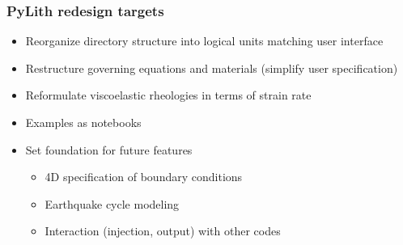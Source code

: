\documentclass[aspectratio=169]{beamer}
\begin{document}
\begin{frame}
  \frametitle{PyLith redesign targets}

  \begin{itemize}
  \item Reorganize directory structure into logical units matching user interface
  \item Restructure governing equations and materials (simplify user specification)
  \item Reformulate viscoelastic rheologies in terms of strain rate
  \item Examples as notebooks
  \item Set foundation for future features
    \begin{itemize}
    \item 4D specification of boundary conditions
    \item Earthquake cycle modeling
    \item Interaction (injection, output) with other codes
    \end{itemize}
  \end{itemize}

\end{frame}
\end{document}
